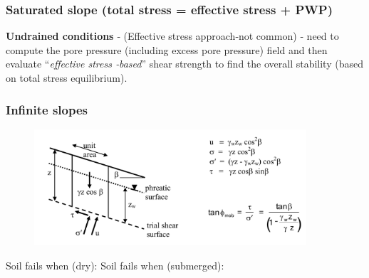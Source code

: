 \documentclass[notes]{beamer}
\begin{document}
\begin{frame}
\frametitle{Saturated slope (total stress = effective stress + PWP)}
\textbf{Undrained conditions} ‐ (Effective stress approach‐not common) ‐ need to
compute the pore pressure (including excess pore pressure) field and then
evaluate ``\textit{effective stress ‐based}'' shear strength to find the overall stability
(based on total stress equilibrium).
\end{frame}

\begin{frame}
\frametitle{Infinite slopes}
\begin{figure}[ht]
\centering
\includegraphics[width=0.9\textwidth]{figs/infinite-slope.png}
\end{figure}
Soil fails when (dry): 
Soil fails when (submerged): 
\end{frame}
\end{document}
